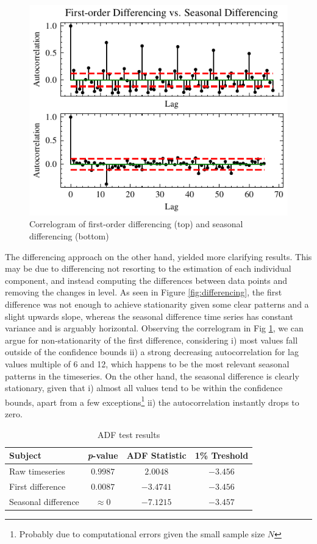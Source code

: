 \documentclass[conference]{IEEEtran}
\begin{document}
\begin{figure}[hbtp]
    \centering
    \includegraphics{../figs/acs_diff.pdf}
    \caption{Correlogram of first-order differencing (top) and seasonal differencing (bottom)}
    \label{fig:acs_diff}
\end{figure}

The differencing approach on the other hand, yielded more clarifying results. This may be due to differencing not resorting to the estimation of each individual component, and instead computing the differences between data points and removing the changes in level. As seen in Figure \ref{fig:differencing}, the first difference was not enough to achieve stationarity given some clear patterns and a slight upwards slope, whereas the seasonal difference time series has constant variance and is arguably horizontal. Observing the correlogram in Fig \ref{fig:acs_diff}, we can argue for non-stationarity of the first difference, considering i) most values fall outside of the confidence bounds ii) a strong decreasing autocorrelation for lag values multiple of 6 and 12, which happens to be the most relevant seasonal patterns in the timeseries. On the other hand, the seasonal difference is clearly stationary, given that i) almost all values tend to be within the confidence bounds, apart from a few exceptions\footnote{Probably due to computational errors given the small sample size $N$} ii) the autocorrelation instantly drops to zero.

\begin{table}[btp]
    \caption{ADF test results}
    \centering
    \begin{tabular}{l|c|c||c}
        Subject & \textit{p}-value & ADF Statistic & 1\% Treshold  \\
        \hline
        Raw timeseries & $0.9987$  &  $2.0048$ & $-3.456$ \\
        First difference & \cellcolor{green!25} $0.0087$ & $-3.4741$ & $-3.456$ \\
        Seasonal difference & \cellcolor{green!25} $\approx 0$ & $-7.1215$ & $-3.457$ \\
    \end{tabular}
    \label{tab:adfuller}
\end{table}
\end{document}
